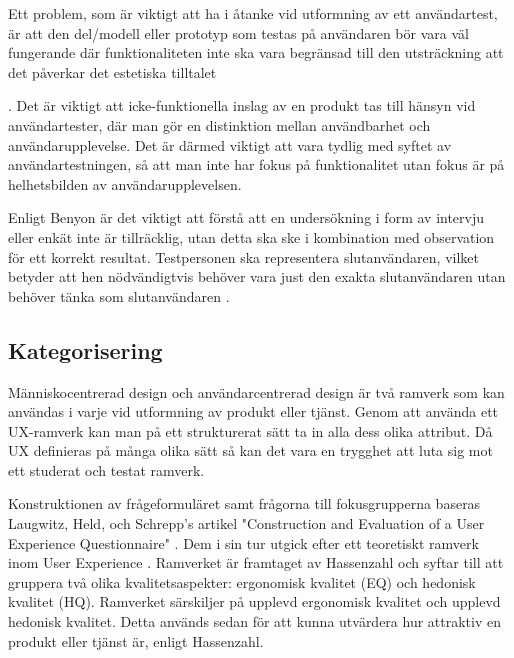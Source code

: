 Ett problem, som är viktigt att ha i åtanke vid utformning av ett användartest, är att den del/modell eller prototyp som testas på användaren bör vara väl fungerande där funktionaliteten inte ska vara begränsad till den utsträckning att det påverkar det estetiska tilltalet{\cite{Gualtieri2009BestDesign}. Det är viktigt att icke-funktionella inslag av en produkt tas till hänsyn vid användartester, där man gör en distinktion mellan användbarhet och användarupplevelse. Det är därmed viktigt att vara tydlig med syftet av användartestningen, så att man inte har fokus på funktionalitet utan fokus är på helhetsbilden av användarupplevelsen.
\newline

Enligt Benyon \cite{Benyon2013Designing3/E} är det viktigt att förstå att en undersökning i form av intervju eller enkät inte är tillräcklig, utan detta ska ske i kombination med observation för ett korrekt resultat. Testpersonen ska representera slutanvändaren, vilket betyder att hen nödvändigtvis behöver vara just den exakta slutanvändaren utan behöver tänka som slutanvändaren \cite{Benyon2013Designing3/E}.
\newline

\subsection{Kategorisering}
\label{kategorisering}
Människocentrerad design och användarcentrerad design är två ramverk som kan användas i varje vid utformning av produkt eller tjänst. Genom att använda ett UX-ramverk kan man på ett strukturerat sätt ta in alla dess olika attribut. Då UX definieras på många olika sätt så kan det vara en trygghet att luta sig mot ett studerat och testat ramverk. 
\newline

Konstruktionen av frågeformuläret samt frågorna till fokusgrupperna baseras Laugwitz, Held, och Schrepp's artikel "Construction and Evaluation of a User Experience
Questionnaire" \cite{Laugwitz2008ConstructionQuestionnaire}. Dem i sin tur utgick efter ett teoretiskt ramverk inom User Experience \cite{HassenzahlUserQuality}. Ramverket är framtaget av Hassenzahl och syftar till att gruppera två olika kvalitetsaspekter: ergonomisk kvalitet (EQ) och hedonisk kvalitet (HQ)\cite{HassenzahlUserQuality}. Ramverket särskiljer på upplevd ergonomisk kvalitet och upplevd hedonisk kvalitet. Detta används sedan för att kunna utvärdera hur attraktiv en produkt eller tjänst är, enligt Hassenzahl. 
\newline

}

